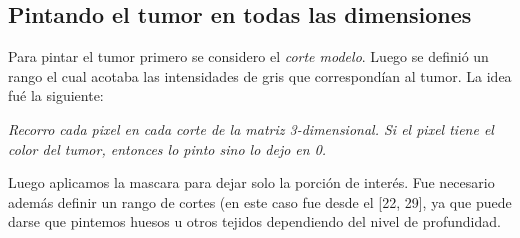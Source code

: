 \documentclass[conference]{IEEEtran}
\begin{document}
\subsection{Pintando el tumor en todas las dimensiones}
Para pintar el tumor primero se considero el \textit{corte modelo}. Luego se definió un rango el cual acotaba las intensidades de gris que correspondían al tumor. La idea fué la siguiente:
\begin{center}
\textit{Recorro cada pixel en cada corte de la matriz 3-dimensional. Si el pixel tiene el color del tumor, entonces lo pinto sino lo dejo en 0.}
\end{center}
Luego aplicamos la mascara para dejar solo la porción de interés. Fue necesario además definir un rango de cortes (en este caso fue desde el [22, 29], ya que puede darse que pintemos huesos u otros tejidos dependiendo del nivel de profundidad.\\\\
\end{document}
